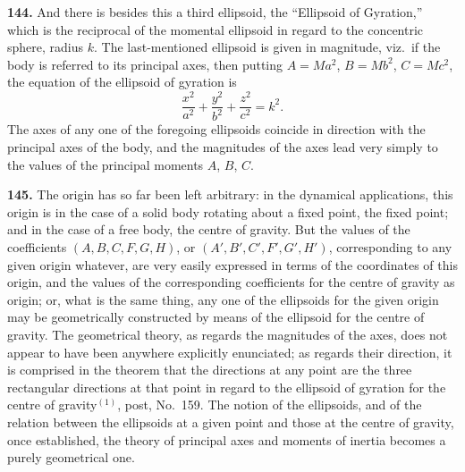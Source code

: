 \documentclass[11pt,a4paper]{book}
\begin{document}
\textbf{144.} And there is besides this a third ellipsoid, the ``Ellipsoid of Gyration,'' which is the reciprocal of the momental ellipsoid in regard to the concentric sphere, radius $k$. The last-mentioned ellipsoid is given in magnitude, viz.\ if the body is referred to its principal axes, then putting $A = Ma^2$, $B = Mb^2$, $C = Mc^2$, the equation of the ellipsoid of gyration is
\[
\frac{x^2}{a^2} + \frac{y^2}{b^2} + \frac{z^2}{c^2} = k^2.
\]
The axes of any one of the foregoing ellipsoids coincide in direction with the principal axes of the body, and the magnitudes of the axes lead very simply to the values of the principal moments $A$, $B$, $C$.

\textbf{145.} The origin has so far been left arbitrary: in the dynamical applications, this origin is in the case of a solid body rotating about a fixed point, the fixed point; and in the case of a free body, the centre of gravity. But the values of the coefficients $(A, B, C, F, G, H)$, or $(A', B', C', F', G', H')$, corresponding to any given origin whatever, are very easily expressed in terms of the coordinates of this origin, and the values of the corresponding coefficients for the centre of gravity as origin; or, what is the same thing, any one of the ellipsoids for the given origin may be geometrically constructed by means of the ellipsoid for the centre of gravity. The geometrical theory, as regards the magnitudes of the axes, does not appear to have been anywhere explicitly enunciated; as regards their direction, it is comprised in the theorem that the directions at any point are the three rectangular directions at that point in regard to the ellipsoid of gyration for the centre of gravity$^{(1)}$, post, No.~159. The notion of the ellipsoids, and of the relation between the ellipsoids at a given point and those at the centre of gravity, once established, the theory of principal axes and moments of inertia becomes a purely geometrical one.

\end{document}
